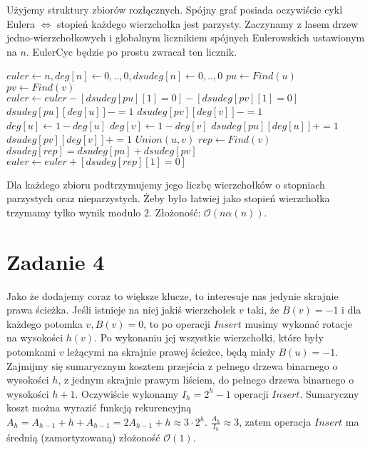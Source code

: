\documentclass[12pt, a4paper]{article}
\newcommand{\MCALO}{\mathcal{O}}
\begin{document}
Użyjemy struktury zbiorów rozłącznych. Spójny graf posiada oczywiście cykl Eulera $\iff$ stopień
każdego wierzchołka jest parzysty. Zaczynamy z lasem drzew jedno-wierzchołkowych i globalnym licznikiem
spójnych Eulerowskich ustawionym na $n$. EulerCyc będzie po prostu zwracał ten licznik.
\begin{algorithmic}
\State $euler \gets n, deg[n] \gets {0,..,0}, dsudeg[n] \gets {0,..,0}$
\State $pu \gets Find(u)$
\State $pv \gets Find(v)$
\State $euler \gets euler - [dsudeg[pu][1] = 0] - [dsudeg[pv][1] = 0]$
\State $dsudeg[pu][deg[u]] -= 1$
\State $dsudeg[pv][deg[v]] -= 1$
\State $deg[u] \gets 1 - deg[u]$
\State $deg[v] \gets 1 - deg[v]$
\State $dsudeg[pu][deg[u]] += 1$
\State $dsudeg[pv][deg[v]] += 1$
\State $Union(u, v)$
\State $rep \gets Find(v)$
\State $dsudeg[rep] = dsudeg[pu] + dsudeg[pv]$
\State $euler \gets euler + [dsudeg[rep][1] = 0]$
\EndFunction
\end{algorithmic}
Dla każdego zbioru podtrzymujemy jego liczbę wierzchołków o stopniach parzystych oraz nieparzystych.
Żeby było łatwiej jako stopień wierzchołka trzymamy tylko wynik modulo $2$.
Złożoność: $\MCALO(n\alpha(n))$.

\section*{Zadanie 4}
Jako że dodajemy coraz to większe klucze, to interesuje nas jedynie skrajnie
prawa ścieżka. Jeśli istnieje na niej jakiś wierzchołek $v$ taki, że $B(v)=-1$
i dla każdego potomka $v, B(v) = 0$, to po operacji $\mathit{Insert}$ musimy
wykonać rotacje na wysokości $h(v)$. Po wykonaniu jej wszystkie wierzchołki,
które były potomkami $v$ leżącymi na skrajnie prawej ścieżce, będą miały
$B(u)=-1$. Zajmijmy się sumarycznym kosztem przejścia z pełnego drzewa
binarnego o wysokości $h$, z jednym skrajnie prawym liściem, do pełnego drzewa
binarnego o wysokości $h+1$. Oczywiście wykonamy $I_h = 2^h - 1$ operacji
$\mathit{Insert}$. Sumaryczny koszt można wyrazić funkcją rekurencyjną $A_h
= A_{h-1} + h + A_{h-1} = 2A_{h-1} + h \approx 3\cdot 2^h$. $\frac{A_h}{I_h}
\approx 3$, zatem operacja $\mathit{Insert}$ ma średnią (zamortyzowaną)
złożoność $\MCALO(1)$.
\end{document}
